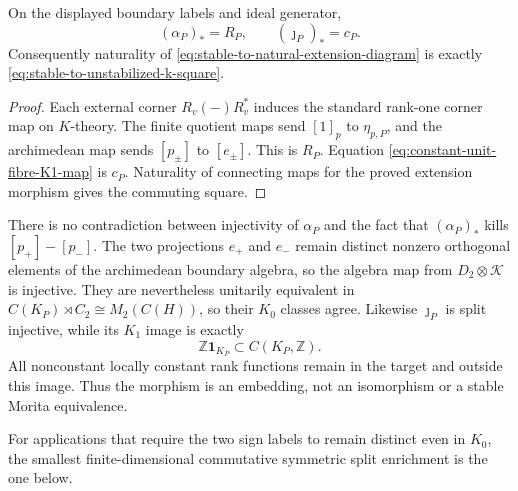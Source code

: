 \begin{corollary}
\label{cor:stable-to-natural-K-square-lifted}
On the displayed boundary labels and ideal generator,
\[
 (\alpha_P)_*=R_P,\qquad
 (\jmath_P)_*=c_P.
\]
Consequently naturality of
\eqref{eq:stable-to-natural-extension-diagram} is exactly
\eqref{eq:stable-to-unstabilized-k-square}.
\end{corollary}

\begin{proof}
Each external corner $R_v(-)R_v^*$ induces the standard rank-one corner map
on $K$-theory.  The finite quotient maps send $[1]_p$ to $\eta_{p,P}$, and
the archimedean map sends $[p_\pm]$ to $[e_\pm]$.  This is $R_P$.
Equation \eqref{eq:constant-unit-fibre-K1-map} is $c_P$.  Naturality of
connecting maps for the proved extension morphism
\cite[Definition~21.1.1 and Example~21.1.2(a)]{blackadar1986} gives the
commuting square.
\end{proof}

There is no contradiction between injectivity of $\alpha_P$ and the fact
that $(\alpha_P)_*$ kills $[p_+]-[p_-]$.  The two projections $e_+$ and
$e_-$ remain distinct nonzero orthogonal elements of the archimedean boundary
algebra, so the algebra map from $D_2\otimes\mathcal K$ is injective.  They
are nevertheless unitarily equivalent in
$C(K_P)\rtimes C_2\cong M_2(C(H))$, so their $K_0$ classes agree.  Likewise
$\jmath_P$ is split injective, while its $K_1$ image is exactly
\[
 \mathbb Z\mathbf1_{K_P}\subset C(K_P,\mathbb Z).
\]
All nonconstant locally constant rank functions remain in the target and
outside this image.  Thus the morphism is an embedding, not an isomorphism or
a stable Morita equivalence.

For applications that require the two sign labels to remain distinct even in
$K_0$, the smallest finite-dimensional commutative symmetric split enrichment
is the one below.

